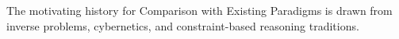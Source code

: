 The motivating history for Comparison with Existing Paradigms is drawn from inverse problems, cybernetics, and constraint-based reasoning traditions.
